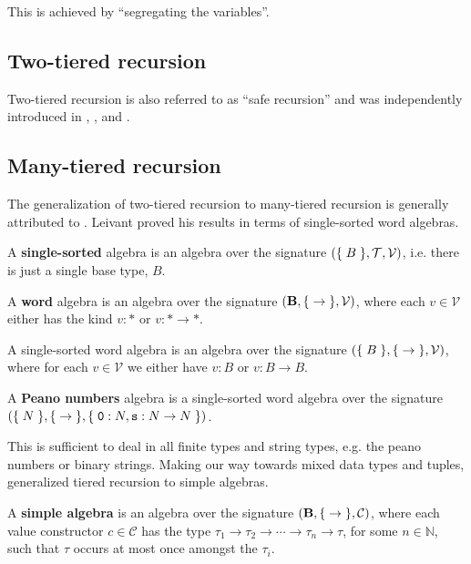 This is achieved by ``segregating the variables''.


\subsection{Two-tiered recursion}

Two-tiered recursion is also referred to as ``safe recursion'' and was
independently introduced in \cite{simmons-1988}, \cite{leivant-1990}, and
\cite{bellantoni-cook-1992}.

\subsection{Many-tiered recursion}

The generalization of two-tiered recursion to many-tiered recursion is
generally attributed to \cite{leivant-1995}. Leivant proved his results in
terms of single-sorted word algebras.

\begin{definition} A \textbf{single-sorted} algebra is an algebra over the
signature ${\mathopen{}\left({\mathopen{}\left\{\mathrel{}{B}\mathrel{}\right\}\mathclose{}, \mathcal{T}, \mathcal{V}}\right)\mathclose{}}$, i.e. there is just a single
base type, $B$. \end{definition}

\begin{definition} A \textbf{word} algebra is an algebra over the signature
${\mathopen{}\left({\mathbf{B}, \mathopen{}\left\{\mathrel{}{\rightarrow}\mathrel{}\right\}\mathclose{}, \mathcal{V}}\right)\mathclose{}}$, where each $v \in
\mathcal{V}$ either has the kind $v : *$ or $v : *\rightarrow *$.
\end{definition}

\begin{example} A single-sorted word algebra is an algebra over the signature
${\mathopen{}\left({\mathopen{}\left\{\mathrel{}{B}\mathrel{}\right\}\mathclose{},\mathopen{}\left\{\mathrel{}{\rightarrow}\mathrel{}\right\}\mathclose{}, \mathcal{V}}\right)\mathclose{}}$, where for each $v \in
\mathcal{V}$ we either have $v : B$ or $v : B\rightarrow B$. \end{example}

\begin{definition} A \textbf{Peano numbers} algebra is a single-sorted word
algebra over the signature ${\mathopen{}\left({\mathopen{}\left\{\mathrel{}{N}\mathrel{}\right\}\mathclose{}, \mathopen{}\left\{\mathrel{}{\rightarrow}\mathrel{}\right\}\mathclose{},\mathopen{}\left\{\mathrel{}{\mathtt{0} : N,
\mathtt{s} : N \rightarrow N}\mathrel{}\right\}\mathclose{}}\right)\mathclose{}}$. \end{definition}


This is sufficient to deal in all finite types and string types, e.g.  the
peano numbers or binary strings. Making our way towards mixed data types and
tuples, \cite{marion-2003} generalized tiered recursion to simple algebras.
 
\begin{definition} A \textbf{simple algebra} is an algebra over the signature
${\mathopen{}\left({\mathbf{B}, \mathopen{}\left\{\mathrel{}{\rightarrow}\mathrel{}\right\}\mathclose{}, \mathcal{C}}\right)\mathclose{}}$, where each value constructor
$c \in \mathcal{C}$ has the type $\tau_1 \rightarrow \tau_2 \rightarrow \cdots
\rightarrow \tau_n \rightarrow \tau$, for some $n\in \mathbb{N}$, such that
$\tau$ occurs at most once amongst the $\tau_i$.  \end{definition}

